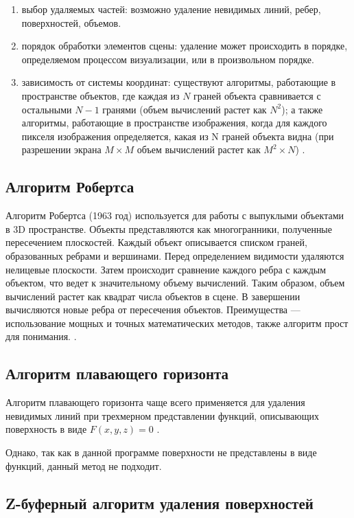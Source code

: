 \begin{enumerate}
	\item выбор удаляемых частей: возможно удаление невидимых линий, ребер, поверхностей, объемов.
	\item порядок обработки элементов сцены: удаление может происходить в порядке, определяемом процессом визуализации, или в произвольном порядке.
	\item зависимость от системы координат: существуют алгоритмы, работающие в пространстве объектов, где каждая из $N$ граней объекта сравнивается с остальными $N - 1$ гранями (объем вычислений растет как $N^2$); а также алгоритмы, работающие в пространстве изображения, когда для каждого пикселя изображения определяется, какая из N граней объекта видна (при разрешении экрана $M\times{M}$ объем вычислений растет как $M^2 \times N$) \cite{del_line}.
\end{enumerate}

\subsection{Алгоритм Робертса}

Алгоритм Робертса (1963 год) используется для работы с выпуклыми объектами в 3D пространстве. Объекты представляются как многогранники, полученные пересечением плоскостей. Каждый объект описывается списком граней, образованных ребрами и вершинами. Перед определением видимости удаляются нелицевые плоскости. Затем происходит сравнение каждого ребра с каждым объектом, что ведет к значительному объему вычислений. Таким образом, объем вычислений растет как квадрат числа объектов в сцене. В завершении вычисляются новые ребра от пересечения объектов. Преимущества ---  использование мощных и точных математических методов, также алгоритм прост для понимания. \cite{del_line}. 

\subsection{Алгоритм плавающего горизонта}

Алгоритм плавающего горизонта чаще всего применяется для удаления невидимых линий при трехмерном представлении функций, описывающих поверхность в виде $F(x, y, z) = 0$ \cite{del_line}.

Однако, так как в данной программе поверхности не представлены в виде функций, данный метод не подходит.

\subsection{Z-буферный алгоритм удаления поверхностей}

